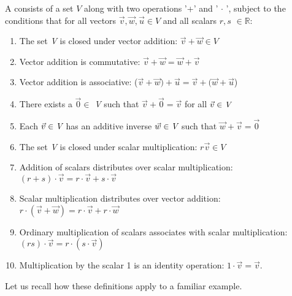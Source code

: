 \begin{defn}
A  consists of a set $V$ along with two operations '+' and  ' $\cdot$ ', subject to the conditions that for all vectors $ \vec {v},\vec{w},\vec{u} \in V$ and all scalars $r, s$ $\in \mathbb{R}$:
\begin {enumerate} [(1)]
\item
The set \emph{V} is closed under vector addition: \quad  $\vec{v} + \vec{w} \in V$
\item
Vector addition is commutative: \quad  $\vec{v} + \vec{w} = \vec{w} + \vec{v}$
\item
Vector addition is associative: \quad ($\vec{v} + \vec{w}) + \vec{u} = \vec{v} + (\vec{w} + \vec{u}$)
\item
There exists a  $\vec{0} \in$ \emph{V} such that $\vec{v} + \vec{0} = \vec{v}$ for all $\vec{v} \in \emph{V}$
\item
Each $\vec{v} \in \emph{V}$ has an additive inverse $\vec{w} \in \emph{V}$ such that $\vec{w} + \vec{v} = \vec{0}$
\item
The set \emph{V} is closed under scalar multiplication: \quad  $ r  \vec{v} \in V$
\item
Addition of scalars distributes over scalar multiplication: \quad $(r+ s) \cdot \vec{v} = r \cdot \vec{v} + s \cdot \vec{v}$
\item
Scalar multiplication distributes over vector addition: \quad $ r \cdot( \vec{v} + \vec{w}) = r \cdot \vec{v} + r \cdot \vec{w}$
\item
Ordinary multiplication of scalars associates with scalar multiplication: \quad $(rs) \cdot \vec{v} = r \cdot (s \cdot \vec{v})$
\item
Multiplication by the scalar 1 is an identity operation: $1 \cdot \vec{v} = \vec{v}$.
\end{enumerate}

\end{defn}
Let us recall how these definitions apply to a familiar example.

